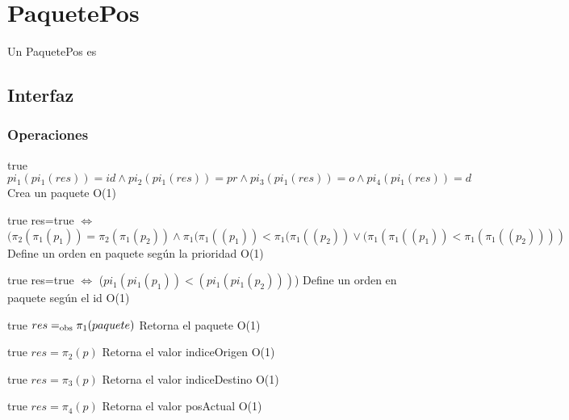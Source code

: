 \section{PaquetePos}

Un PaquetePos es

\subsection{Interfaz}



\subsubsection*{Operaciones}

 {true}
 {$pi_1(pi_1(res))=id \land pi_2(pi_1(res))=pr \land pi_3(pi_1(res))=o \land pi_4(pi_1(res))=d$}
 {Crea un paquete}
 {O(1)}
 {}
 
 {true}
 {res=true $\iff$ $(\pi_2(\pi_1(p_1)) = \pi_2(\pi_1(p_2)) \land \pi_1(\pi_1((p_1)) < \pi_1(\pi_1((p_2)) \lor (\pi_1(\pi_1((p_1)) < \pi_1(\pi_1((p_2))))$}
 {Define un orden en paquete seg\'un la prioridad}
 {O(1)}
 {}
 
 {true}
 {res=true $\iff$ ($pi_1(pi_1(p_1))<(pi_1(pi_1(p_2)))$)}
 {Define un orden en paquete seg\'un el id}
 {O(1)}
 {}
 
 {true}
 {$res =_{\mathrm{obs}} \pi_1(paquete)$}
 {Retorna el paquete}
 {O(1)}
 {}
 
 {true}
 {$res = \pi_2(p)$}
 {Retorna el valor indiceOrigen}
 {O(1)}
 {}
 
 {true}
 {$res = \pi_3(p)$}
 {Retorna el valor indiceDestino}
 {O(1)}
 {}  
 
 {true}
 {$res = \pi_4(p)$}
 {Retorna el valor posActual}
 {O(1)}
 {} 
  
